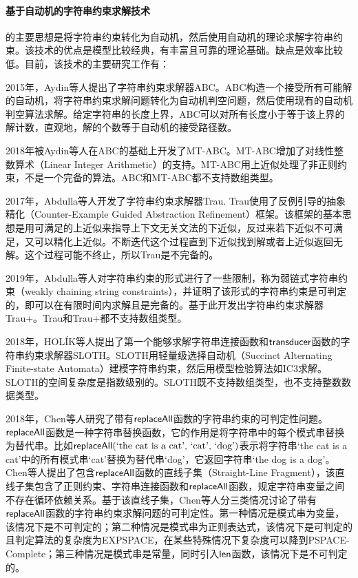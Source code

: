 \paragraph{基于自动机的字符串约束求解技术}的主要思想是将字符串约束转化为自动机，然后使用自动机的理论求解字符串约束。该技术的优点是模型比较经典，有丰富且可靠的理论基础。缺点是效率比较低。目前，该技术的主要研究工作有：

2015年，Aydin等人\cite{abc}提出了字符串约束求解器ABC。ABC构造一个接受所有可能解的自动机，将字符串约束求解问题转化为自动机判空问题，然后使用现有的自动机判空算法求解。给定字符串的长度上界，ABC可以对所有长度小于等于该上界的解计数，直观地，解的个数等于自动机的接受路径数。

2018年被Aydin等人\cite{mult_abc}在ABC的基础上开发了MT-ABC。MT-ABC增加了对线性整数算术（Linear Integer Arithmetic）的支持。MT-ABC用上近似处理了非正则约束，不是一个完备的算法。ABC和MT-ABC都不支持数组类型。


2017年，Abdulla等人\cite{trau_2017}\cite{trau_2018}开发了字符串约束求解器Trau. Trau使用了反例引导的抽象精化（Counter-Example Guided Abstraction Refinement）框架。该框架的基本思想是用可满足的上近似来指导上下文无关文法的下近似，反过来若下近似不可满足，又可以精化上近似。不断迭代这个过程直到下近似找到解或者上近似返回无解。这个过程可能不终止，所以Trau是不完备的。

2019年，Abdulla等人\cite{trau+}对字符串约束的形式进行了一些限制，称为弱链式字符串约束（weakly chaining string constraints），并证明了该形式的字符串约束是可判定的，即可以在有限时间内求解且是完备的。基于此开发出字符串约束求解器Trau+。Trau和Trau+都不支持数组类型。

2018年，HOLÍK等人\cite{sloth}提出了第一个能够求解字符串连接函数和$\mathsf{transducer}$函数的字符串约束求解器SLOTH。SLOTH用轻量级选择自动机（Succinct Alternating Finite-state Automata）建模字符串约束，然后用模型检验算法如IC3求解。SLOTH的空间复杂度是指数级别的。SLOTH既不支持数组类型，也不支持整数数据类型。

2018年，Chen等人\cite{repalceall_decidable}研究了带有$\mathsf{replaceAll}$函数的字符串约束的可判定性问题。$\mathsf{replaceAll}$函数是一种字符串替换函数，它的作用是将字符串中的每个模式串替换为替代串。比如$\mathsf{replaceAll}(\text{‘the cat is a cat’, ‘cat’, ‘dog’})$表示将字符串‘the cat is a cat’中的所有模式串‘cat’替换为替代串‘dog’，它返回字符串‘the dog is a dog’。 Chen等人提出了包含$\mathsf{replaceAll}$函数的直线子集（Straight-Line Fragment），该直线子集包含了正则约束、字符串连接函数和$\mathsf{replaceAll}$函数，规定字符串变量之间不存在循环依赖关系。基于该直线子集，Chen等人分三类情况讨论了带有$\mathsf{replaceAll}$函数的字符串约束求解问题的可判定性。第一种情况是模式串为变量，该情况下是不可判定的；第二种情况是模式串为正则表达式，该情况下是可判定的且判定算法的复杂度为EXPSPACE，在某些特殊情况下复杂度可以降到PSPACE-Complete；第三种情况是模式串是常量，同时引入$\mathsf{len}$函数，该情况下是不可判定的。

